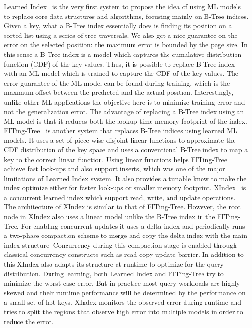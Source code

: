 Learned Index~\cite{learnedindex} is the very first system to propose the idea of using ML models to replace core data structures and algorithms, focusing mainly on B-Tree indices. 
Given a key, what a B-Tree index essentially does is finding its position on a sorted list using a series of tree traversals.
We also get a nice guarantee on the error on the selected position: the maximum error is bounded by the page size.
In this sense a B-Tree index is a model which captures the cumulative distribution function (CDF) of the key values.
Thus, it is possible to replace B-Tree index with an ML model which is trained to capture the CDF of the key values.
The error guarantee of the ML model can be found during training, which is the maximum offset between the predicted and the actual position.
Interestingly, unlike other ML applications the objective here is to minimize training error and not the generalization error.
The advantage of replacing a B-Tree index using an ML model is that it reduces both the lookup time memory footprint of the index.
FITing-Tree~\cite{fitingtree} is another system that replaces B-Tree indices using learned ML models.
It uses a set of piece-wise disjoint linear functions to approximate the CDF distribution of the key space and uses a conventional B-Tree index to map a key to the correct linear function.
Using linear functions helps FITing-Tree achieve fast look-ups and also support inserts, which was one of the major limitations of Learned Index system.
It also provides a tunable know to make the index optimize either for faster look-ups or smaller memory footprint.
XIndex~\cite{xindex} is a concurrent learned index which support read, write, and update operations.
The architecture of XIndex is similar to that of FITing-Tree.
However, the root node in XIndex also uses a linear model unlike the B-Tree index in the FITing-Tree.
For enabling concurrent updates it uses a delta index and periodically runs a two-phase compaction scheme to merge and copy the delta index with the main index structure.
Concurrency during this compaction stage is enabled through classical concurrency constructs such as read-copy-update barrier.
In addition to this XIndex also adapts its structure at runtime to optimize for the query distribution.
During learning, both Learned Index and FITing-Tree try to minimize the worst-case error.
But in practice most query workloads are highly skewed and their runtime performance will be determined by the performance on a small set of hot keys.
XIndex monitors the observed error during runtime and tries to split the regions that observe high error into multiple models in order to reduce the error.

